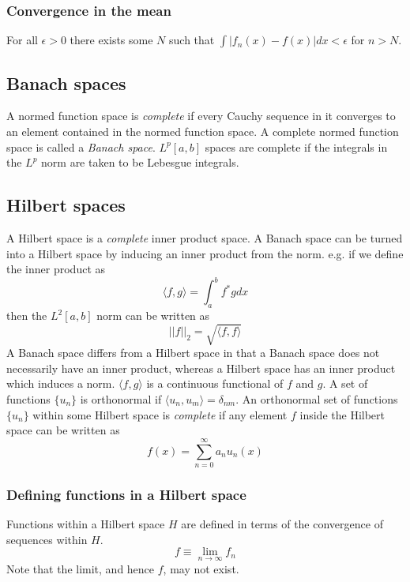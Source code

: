 \documentclass[]{article}
\begin{document}
\subsubsection{Convergence in the mean}
For all $\epsilon > 0$ there exists some $N$ such that $\int |f_{n}(x) - f(x)|dx < \epsilon$ for $n > N$.

\subsection{Banach spaces}
A normed function space is \textit{complete} if every Cauchy sequence in it converges to an element contained in the normed function space. A complete normed function space is called a \textit{Banach space}. $L^{p}[a,b]$ spaces are complete if the integrals in the $L^{p}$ norm are taken to be Lebesgue integrals.

\subsection{Hilbert spaces}
A Hilbert space is a \textit{complete} inner product space. A Banach space can be turned into a Hilbert space by inducing an inner product from the norm. e.g. if we define the inner product as
\begin{equation} \langle f, g \rangle = \int_{a}^{b} f^{*}g dx \end{equation}
then the $L^{2}[a,b]$ norm can be written as 
\begin{equation} ||f||_{2} = \sqrt{\langle f,f \rangle} \end{equation}
A Banach space differs from a Hilbert space in that a Banach space does not necessarily have an inner product, whereas a Hilbert space has an inner product which induces a norm.
$\langle f, g \rangle$ is a continuous functional of $f$ and $g$.
A set of functions $\{ u_{n} \}$ is orthonormal if $\langle u_{n}, u_{m}\rangle = \delta_{nm}$. An orthonormal set of functions $\{ u_{n} \}$ within some Hilbert space is \textit{complete} if any element $f$ inside the Hilbert space can be written as 
\begin{equation} f(x) = \sum_{n=0}^{\infty} a_{n}u_{n}(x) \end{equation}
\subsubsection{Defining functions in a Hilbert space}
Functions within a Hilbert space $H$ are defined in terms of the convergence of sequences within $H$. 
\begin{equation} f \equiv \lim_{n \to \infty} f_{n} \end{equation}
Note that the limit, and hence $f$, may not exist.
\end{document}

